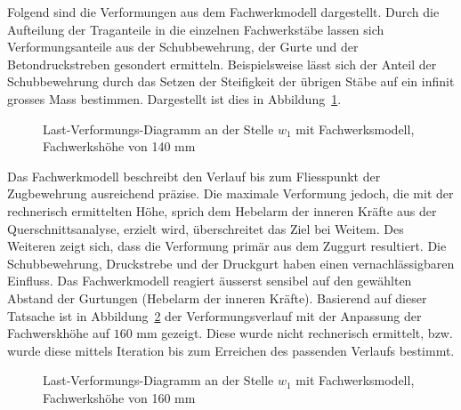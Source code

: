 \documentclass[
  12pt,
  letterpaper,
  egregdoesnotlikesansseriftitles]{scrreprt}
\begin{document}
Folgend sind die Verformungen aus dem Fachwerkmodell dargestellt. Durch
die Aufteilung der Traganteile in die einzelnen Fachwerkstäbe lassen
sich Verformungsanteile aus der Schubbewehrung, der Gurte und der
Betondruckstreben gesondert ermitteln. Beispielsweise lässt sich der
Anteil der Schubbewehrung durch das Setzen der Steifigkeit der übrigen
Stäbe auf ein infinit grosses Mass bestimmen. Dargestellt ist dies in
Abbildung~\ref{fig-last_verformung_fachwerk}.

\begin{figure}[H]


\caption{\label{fig-last_verformung_fachwerk}Last-Verformungs-Diagramm
an der Stelle \(w_1\) mit Fachwerksmodell, Fachwerkshöhe von 140 mm}

\end{figure}%

Das Fachwerkmodell beschreibt den Verlauf bis zum Fliesspunkt der
Zugbewehrung ausreichend präzise. Die maximale Verformung jedoch, die
mit der rechnerisch ermittelten Höhe, sprich dem Hebelarm der inneren
Kräfte aus der Querschnittsanalyse, erzielt wird, überschreitet das Ziel
bei Weitem. Des Weiteren zeigt sich, dass die Verformung primär aus dem
Zuggurt resultiert. Die Schubbewehrung, Druckstrebe und der Druckgurt
haben einen vernachlässigbaren Einfluss. Das Fachwerkmodell reagiert
äusserst sensibel auf den gewählten Abstand der Gurtungen (Hebelarm der
inneren Kräfte). Basierend auf dieser Tatsache ist in
Abbildung~\ref{fig-last_verformung_fachwerk_z_var} der
Verformungsverlauf mit der Anpassung der Fachwerskhöhe auf
\(160\text{ mm}\) gezeigt. Diese wurde nicht rechnerisch ermittelt, bzw.
wurde diese mittels Iteration bis zum Erreichen des passenden Verlaufs
bestimmt.

\begin{figure}[H]


\caption{\label{fig-last_verformung_fachwerk_z_var}Last-Verformungs-Diagramm
an der Stelle \(w_1\) mit Fachwerksmodell, Fachwerkshöhe von 160 mm}

\end{figure}%
\end{document}
